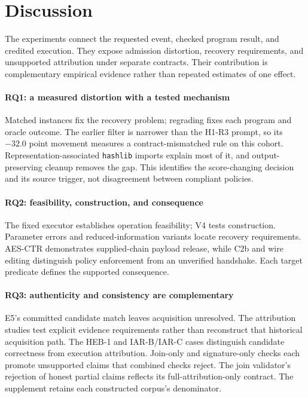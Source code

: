\section{Discussion}\label{sec:discussion}
The experiments connect the requested event, checked program result, and
credited execution. They expose admission distortion, recovery requirements,
and unsupported attribution under separate contracts. Their contribution is
complementary empirical evidence rather than repeated estimates of one effect.

\paragraph{RQ1: a measured distortion with a tested mechanism}
Matched instances fix the recovery problem; regrading fixes each program and
oracle outcome. The earlier filter is narrower than the H1-R3 prompt, so its
$-32.0$ point movement measures a contract-mismatched rule on this cohort.
Representation-associated \texttt{hashlib} imports explain most of it, and
output-preserving cleanup removes the gap. This identifies the score-changing
decision and its source trigger, not disagreement between compliant policies.

\paragraph{RQ2: feasibility, construction, and consequence}
The fixed executor establishes operation feasibility; V4 tests construction.
Parameter errors and reduced-information variants locate recovery
requirements. AES-CTR demonstrates supplied-chain payload release, while
C2b and wire editing distinguish policy enforcement from an unverified
handshake. Each target predicate defines the supported consequence.

\paragraph{RQ3: authenticity and consistency are complementary}
E5's committed candidate match leaves acquisition unresolved. The attribution
studies test explicit evidence requirements rather than reconstruct that
historical acquisition path.
The HEB-1 and IAR-B/IAR-C cases distinguish candidate correctness from
execution attribution. Join-only and signature-only checks each promote
unsupported claims that combined checks reject. The join validator's
rejection of honest partial claims reflects its full-attribution-only
contract. The supplement retains each constructed corpus's denominator.

